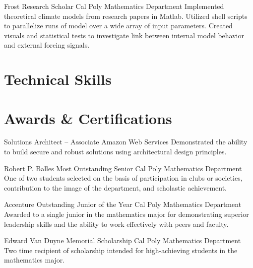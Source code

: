 \documentclass[letterpaper, 11pt, sans]{moderncv}
\begin{document}
        {Frost Research Scholar}
        {Cal Poly Mathematics Department}{}{}
        {
            Implemented theoretical climate models from research papers in Matlab.\newline
            Utilized shell scripts to parallelize runs of model over a wide array of input parameters.\newline
            Created visuals and statistical tests to investigate link between internal model behavior and external forcing signals.\newline 
        }


\section{Technical Skills}


\newpage
\section{Awards \& Certifications}
        {Solutions Architect -- Associate}
        {Amazon Web Services}{}{}
        {Demonstrated the ability to build secure and robust solutions using architectural design principles.\newline}

        {Robert P. Balles Most Outstanding Senior}
        {Cal Poly Mathematics Department}{}{}
        {One of two students selected on the basis of participation in clubs or societies, contribution to the image of the department, and scholastic achievement.\newline}

        {Accenture Outstanding Junior of the Year}
        {Cal Poly Mathematics Department}{}{}
        {Awarded to a single junior in the mathematics major for demonstrating superior leadership skills and the ability to work effectively with peers and faculty.\newline}

        {Edward Van Duyne Memorial Scholarship}
        {Cal Poly Mathematics Department}{}{}
        {Two time recipient of scholarship intended for high-achieving students in the mathematics major.\newline}
\end{document}
